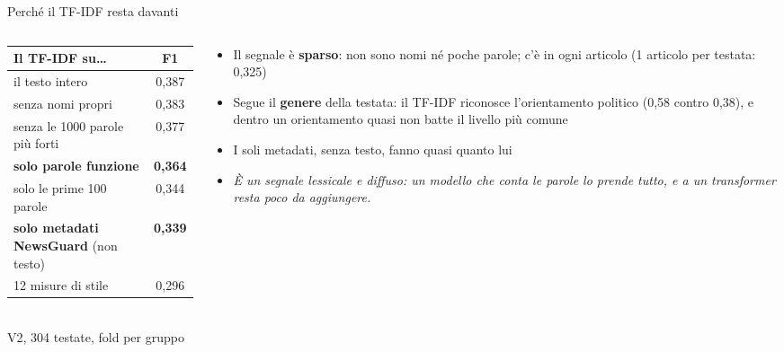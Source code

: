 \documentclass[aspectratio=169]{beamer}
\newcommand{\hl}[1]{\textbf{#1}}
\begin{document}
\begin{frame}{Perch\'e il TF-IDF resta davanti}
  \begin{columns}[c]
    \begin{column}{0.48\textwidth}
      \centering\footnotesize
      \begin{tabular}{lc}
        \toprule
        \textbf{Il TF-IDF su\dots} & \textbf{F1} \\
        \midrule
        il testo intero & 0,387 \\
        senza nomi propri & 0,383 \\
        senza le 1000 parole pi\`u forti & 0,377 \\
        \textbf{solo parole funzione} & \textbf{0,364} \\
        solo le prime 100 parole & 0,344 \\
        \midrule
        \textbf{solo metadati NewsGuard} (non testo) & \textbf{0,339} \\
        12 misure di stile & 0,296 \\
        \bottomrule
      \end{tabular}\\[0.3em]
      {\scriptsize V2, 304 testate, fold per gruppo}
    \end{column}
    \begin{column}{0.52\textwidth}
      \begin{itemize}[<+->]
        \setlength\itemsep{0.5em}
        \footnotesize
        \item Il segnale \`e \hl{sparso}: non sono nomi n\'e poche parole; c'\`e in ogni articolo (1 articolo per testata: 0,325)
        \item Segue il \hl{genere} della testata: il TF-IDF riconosce l'orientamento politico (0,58 contro 0,38), e dentro un orientamento quasi non batte il livello pi\`u comune
        \item I soli metadati, senza testo, fanno quasi quanto lui
        \item[] {\itshape \`E un segnale lessicale e diffuso: un modello che conta le parole lo prende tutto, e a un transformer resta poco da aggiungere.}
      \end{itemize}
    \end{column}
  \end{columns}
\end{frame}
\end{document}

